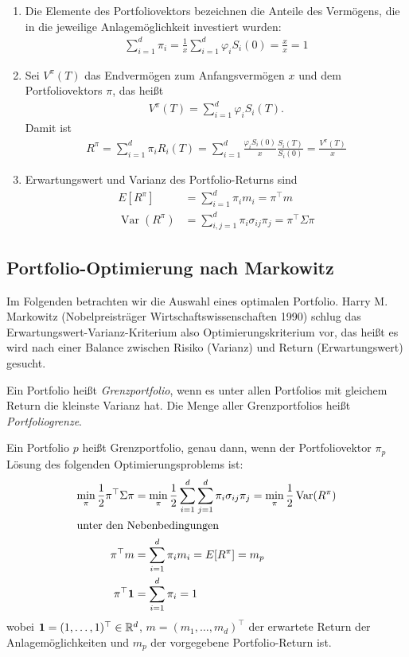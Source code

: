 \documentclass[a4paper,twoside,DIV15,BCOR12mm]{scrbook}
\DeclareMathOperator{\Var}{Var}
\begin{document}
\begin{bemerkung}
\begin{enumerate}
\item Die Elemente des Portfoliovektors bezeichnen die Anteile des Vermögens, die in die jeweilige Anlagemöglichkeit investiert wurden:
\begin{align*}
\sum_{i=1}^d \pi_i = \frac1x \sum_{i=1}^d \varphi_iS_i(0) = \frac xx = 1
\end{align*}
\item Sei $V^\pi(T)$ das Endvermögen zum Anfangsvermögen $x$ und dem Portfoliovektors $\pi$, das heißt
\begin{align*}
V^\pi(T) = \sum_{i=1}^d\varphi_iS_i(T).
\end{align*}
Damit ist
\begin{align*}
R^\pi = \sum_{i=1}^d \pi_iR_i(T) = \sum_{i=1}^d \frac{\varphi_iS_i(0)}x \frac{S_i(T)}{S_i(0)} = \frac{V^\pi(T)}x
\end{align*}
\item Erwartungswert und Varianz des Portfolio-Returns sind 
\begin{align*}
E[R^\pi] &= \sum_{i=1}^d \pi_im_i = \pi^\top m \\
\Var(R^\pi) &= \sum_{i,j=1}^d \pi_i\sigma_{ij}\pi_j = \pi^\top \Sigma \pi
\end{align*}
\end{enumerate}
\end{bemerkung}

\subsection{Portfolio-Optimierung nach Markowitz}
Im Folgenden betrachten wir die Auswahl eines optimalen Portfolio. Harry M. Markowitz (Nobelpreisträger Wirtschaftswissenschaften 1990) schlug das Erwartungswert-Varianz-Kriterium also Optimierungskriterium vor, das heißt es wird nach einer Balance zwischen Risiko (Varianz) und Return (Erwartungswert) gesucht.

\begin{definition}
Ein Portfolio heißt \emph{Grenzportfolio}, wenn es unter allen Portfolios mit gleichem Return die kleinste Varianz hat. Die Menge aller Grenzportfolios heißt \emph{Portfoliogrenze}.
\end{definition}

\begin{satz}
Ein Portfolio $p$ heißt Grenzportfolio, genau dann, wenn der Portfoliovektor $\pi_p$ Lösung des folgenden Optimierungsproblems ist:
\begin{align*}
\min_{\pi} \frac 12 \pi^\top \Sigma \pi &= \min_\pi \frac 12 \sum_{i=1}^d\sum_{j=1}^d \pi_i \sigma_{ij}\pi_j = \min_\pi \frac 12 \Var(R^\pi) \\
\intertext{unter den Nebenbedingungen}
\pi^\top m &= \sum_{i=1}^d \pi_im_i = E[R^\pi] = m_p \\
\pi^\top \mathbf 1 &= \sum_{i=1}^d \pi_i = 1
\end{align*}
wobei $\mathbf 1=(1,\ldots,1)^\top\in\mathbb{R}^d$, $m=(m_1,\ldots,m_d)^\top$ der erwartete Return der Anlagemöglichkeiten und $m_p$ der vorgegebene Portfolio-Return ist.
\end{satz}
\end{document}
